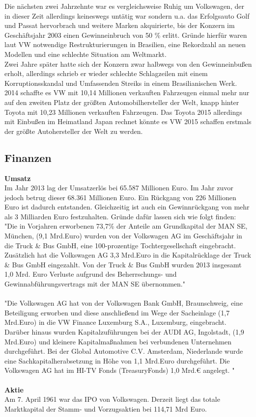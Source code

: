 \documentclass[12pt]{article}
\begin{document}
Die nächsten zwei Jahrzehnte war es vergleichsweise Ruhig um  Volkswagen, der in dieser Zeit allerdings keineswegs untätig war sondern u.a. das Erfolgsauto Golf und Passat hervorbrach und weitere Marken akquirierte, bis der Konzern im Geschäftsjahr 2003 einen Gewinneinbruch von 50 \% erlitt. Gründe hierfür waren laut VW notwendige Restrukturierungen in Brasilien, eine Rekordzahl an neuen Modellen und eine schlechte Situation am Weltmarkt. \cite{sud} \\
Zwei Jahre später hatte sich der Konzern zwar halbwegs von den Gewinneinbußen erholt, allerdings schrieb er wieder schlechte Schlagzeilen mit einem Korruptionsskandal und Umfassenden Streiks in einem Brasilianischen Werk. \cite{autowp}\\
2014 schaffte es VW mit 10,14 Millionen verkauften Fahrzeugen einmal mehr nur auf den zweiten Platz der größten Automobilhersteller der Welt, knapp hinter Toyota mit 10,23 Millionen verkauften Fahrzeugen. Das Toyota 2015 allerdings mit Einbußen im Heimatland Japan rechnet könnte es VW 2015 schaffen erstmals der größte Autohersteller der Welt zu werden.

\subsection{Finanzen}
\textbf{Umsatz}\\
Im Jahr 2013 lag der Umsatzerlös bei 65.587 Millionen Euro. Im Jahr zuvor jedoch betrug dieser 68.361 Millionen Euro. Ein Rückgang von 226 Millionen Euro ist dadurch entstanden. Gleichzeitig ist auch ein Gewinnrückgang von mehr als 3 Milliarden Euro festzuhalten. Gründe dafür lassen sich wie folgt finden:
\\
"Die in Vorjahren erworbenen 73,7\% der Anteile am Grundkapital der MAN SE, München, (9,1 Mrd.Euro) wurden von
der Volkswagen AG im Geschäftsjahr in die Truck \& Bus GmbH, eine 100-prozentige Tochtergesellschaft eingebracht.
Zusätzlich hat die Volkswagen AG 3,3 Mrd.Euro in die Kapitalrücklage der Truck \& Bus GmbH eingezahlt. Von der Truck \&
Bus GmbH wurden 2013 insgesamt 1,0 Mrd. Euro Verluste aufgrund des Beherrschungs- und Gewinnabführungsvertrags
mit der MAN SE übernommen." \cite[Seite 3]{jbilanz2013vw}
\\\\
"Die Volkswagen AG hat von der Volkswagen Bank GmbH, Braunschweig, eine Beteiligung erworben und diese anschließend im Wege der Sacheinlage (1,7 Mrd.Euro) in die VW Finance Luxemburg S.A., Luxemburg, eingebracht.\\
Darüber hinaus wurden Kapitalzuführungen bei der AUDI AG, Ingolstadt, (1,9 Mrd.Euro) und kleinere Kapitalmaßnahmen bei verbundenen Unternehmen durchgeführt. Bei der Global Automotive C.V. Amsterdam, Niederlande
wurde eine Sachkapitalherabsetzung in Höhe von 1,1 Mrd.Euro durchgeführt. Die Volkswagen AG hat im HI-TV Fonds (TreasuryFonds) 1,0 Mrd.€ angelegt. "\cite[Seite 4]{jbilanz2013vw}
\\ \\ 
\textbf{Aktie} \\
Am 7. April 1961 war das IPO von Volkswagen. Derzeit liegt das totale Marktkapital der Stamm- und Vorzugsaktien bei 114,71 Mrd Euro. %
\end{document}
